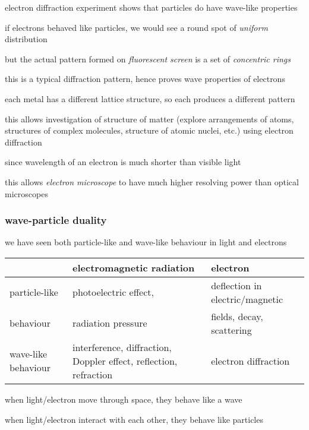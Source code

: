 \cmt electron diffraction experiment shows that particles do have wave-like properties

if electrons behaved like particles, we would see a round spot of \emph{uniform} distribution

but the actual pattern formed on \emph{fluorescent screen} is a set of \emph{concentric rings}

this is a typical diffraction pattern, hence proves wave properties of electrons

\cmt each metal has a different lattice structure, so each produces a different pattern

this allows investigation of structure of matter (explore arrangements of atoms, structures of complex molecules, structure of atomic nuclei, etc.) using electron diffraction

\cmt since wavelength of an electron is much shorter than visible light

this allows \emph{electron microscope} to have much higher resolving power than optical microscopes



\subsubsection{wave-particle duality}

we have seen both particle-like and wave-like behaviour in light and electrons

\begin{center}
	\begin{tabular}{|D{2.5cm}|D{5.5cm}|D{5cm}|}
		\hline
		& electromagnetic radiation & electron \\ \hline
		particle-like & photoelectric effect, & deflection in electric/magnetic \\
		behaviour & radiation 	pressure &  fields, decay, scattering \\  \hline
		wave-like behaviour & interference, diffraction, Doppler
		effect, reflection, refraction & electron diffraction \\ \hline
	\end{tabular}
\end{center}

when light/electron move through space, they behave like a wave

when light/electron interact with each other, they behave like particles

